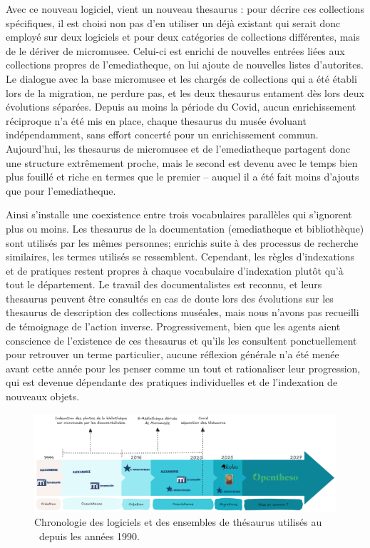 Avec ce nouveau logiciel, vient un nouveau \gls{thesaurus} : pour décrire ces collections spécifiques, il est choisi non pas d'en utiliser un déjà existant qui serait donc employé sur deux logiciels et pour deux catégories de collections différentes, mais de le dériver de \gls{micromusee}. Celui-ci est enrichi de nouvelles entrées liées aux collections propres de l'\gls{emediatheque}, on lui ajoute de nouvelles listes d'\glspl{autorite}. Le dialogue avec la base \gls{micromusee} et les chargés de collections qui a été établi lors de la migration, ne perdure pas, et les deux \gls{thesaurus} entament dès lors deux évolutions séparées. Depuis au moins la période du Covid, aucun enrichissement réciproque n'a été mis en place, chaque \gls{thesaurus} du musée évoluant indépendamment, sans effort concerté pour un enrichissement commun. Aujourd'hui, les \gls{thesaurus} de \gls{micromusee} et de l'\gls{emediatheque} partagent donc une structure extrêmement proche, mais le second est devenu avec le temps bien plus fouillé et riche en termes que le premier -- auquel il a été fait moins d'ajouts que pour l'\gls{emediatheque}.

Ainsi s'installe une coexistence entre trois vocabulaires parallèles qui s'ignorent plus ou moins. Les \gls{thesaurus} de la documentation (\gls{emediatheque} et bibliothèque) sont utilisés par les mêmes personnes; enrichis suite à des processus de recherche similaires, les termes utilisés se ressemblent. Cependant, les règles d'indexations et de pratiques restent propres à chaque vocabulaire d'indexation plutôt qu'à tout le département. Le travail des documentalistes est reconnu, et leurs \gls{thesaurus} peuvent être consultés en cas de doute lors des évolutions sur les \gls{thesaurus} de description des collections muséales, mais nous n'avons pas recueilli de témoignage de l'action inverse. Progressivement, bien que les agents aient conscience de l'existence de ces \gls{thesaurus} et qu'ils les consultent ponctuellement pour retrouver un terme particulier, aucune réflexion générale n'a été menée avant cette année pour les penser comme un tout et rationaliser leur progression, qui est devenue dépendante des pratiques individuelles et de l'indexation de nouveaux objets.

\begin{figure}
	\centering
	\includegraphics[width=0.9\linewidth]{img/FRISE_Thesaurus}
	\caption{Chronologie des logiciels et des ensembles de thésaurus utilisés au \mae~depuis les années 1990.}
	\label{frise:thesaurus}
\end{figure}


